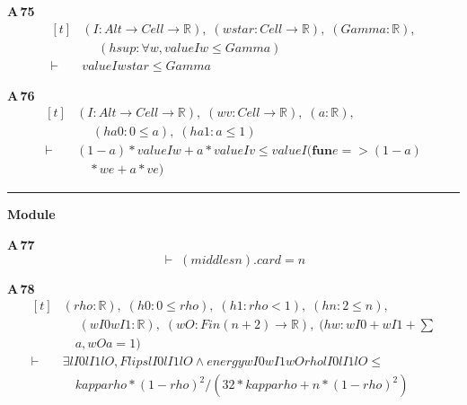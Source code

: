 \noindent\textbf{A\,75}\quad{}
{\footnotesize\[ \begin{aligned}[t]
&(\mathit{I} : \mathit{Alt} \to \mathit{Cell} \to \mathbb{R} ),\; (\mathit{wstar} : \mathit{Cell} \to \mathbb{R} ),\; (\mathit{Gamma} : \mathbb{R} ),\\
&\quad \; (\mathit{hsup} : \forall \mathit{w}, \mathit{value} \mathit{I} \mathit{w} \leq \mathit{Gamma})\\
\vdash\;&\mathit{value} \mathit{I} \mathit{wstar} \leq \mathit{Gamma}
\end{aligned} \]}

\noindent\textbf{A\,76}\quad{}
{\footnotesize\[ \begin{aligned}[t]
&(\mathit{I} : \mathit{Alt} \to \mathit{Cell} \to \mathbb{R} ),\; (\mathit{w} \mathit{v} : \mathit{Cell} \to \mathbb{R} ),\; (\mathit{a} : \mathbb{R} ),\\
&\quad \; (\mathit{ha0} : 0 \leq \mathit{a}),\; (\mathit{ha1} : \mathit{a} \leq 1)\\
\vdash\;&(1 - \mathit{a}) * \mathit{value} \mathit{I} \mathit{w} + \mathit{a} * \mathit{value} \mathit{I} \mathit{v} \leq \mathit{value} \mathit{I} (\mathbf{fun} \mathit{e} => (1 - \mathit{a})\\
&\quad * \mathit{w} \mathit{e} + \mathit{a} * \mathit{v} \mathit{e})
\end{aligned} \]}

\vspace{4pt}\noindent\rule{\columnwidth}{0.4pt}\par\vspace{2pt}
\noindent\textbf{Module }\par\vspace{3pt}

\noindent\textbf{A\,77}\quad{}
{\footnotesize\[ \vdash\; (\mathit{middles} \mathit{n}).\mathit{card} = \mathit{n} \]}

\noindent\textbf{A\,78}\quad{}
{\footnotesize\[ \begin{aligned}[t]
&(\mathit{rho} : \mathbb{R} ),\; (\mathit{h0} : 0 \leq \mathit{rho}),\; (\mathit{h1} : \mathit{rho} < 1),\; (\mathit{hn} : 2 \leq \mathit{n}),\\
&\quad \; (\mathit{wI0} \mathit{wI1} : \mathbb{R} ),\; (\mathit{wO} : \mathit{Fin} (\mathit{n}+2) \to \mathbb{R} ),\; (\mathit{hw} : \mathit{wI0} + \mathit{wI1} + \textstyle\sum\\
&\quad \mathit{a}, \mathit{wO} \mathit{a} = 1)\\
\vdash\;&\exists \mathit{lI0} \mathit{lI1} \mathit{lO}, \mathit{Flips} \mathit{lI0} \mathit{lI1} \mathit{lO} \wedge \mathit{energy} \mathit{wI0} \mathit{wI1} \mathit{wO} \mathit{rho} \mathit{lI0} \mathit{lI1} \mathit{lO} \leq\\
&\quad \mathit{kappa} \mathit{rho}*(1-\mathit{rho})^{2}/(32*\mathit{kappa} \mathit{rho} + \mathit{n}*(1-\mathit{rho})^{2})
\end{aligned} \]}

